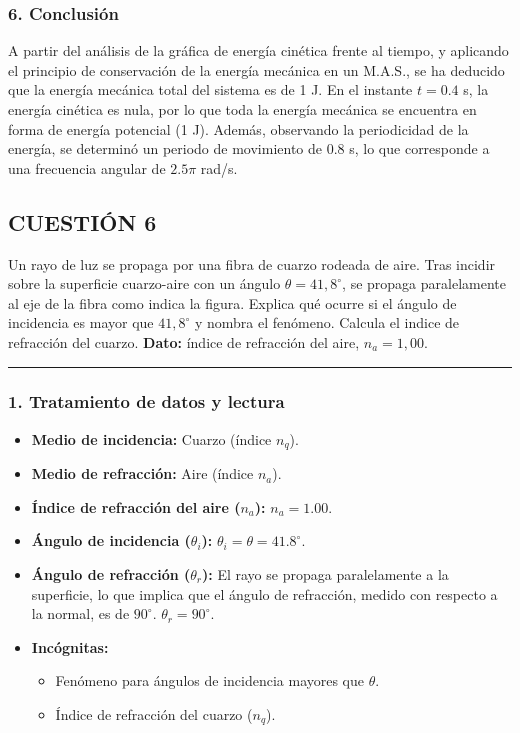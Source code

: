 \subsubsection*{6. Conclusión}
\begin{cajaconclusion}
A partir del análisis de la gráfica de energía cinética frente al tiempo, y aplicando el principio de conservación de la energía mecánica en un M.A.S., se ha deducido que la energía mecánica total del sistema es de 1 J. En el instante $t=0.4$ s, la energía cinética es nula, por lo que toda la energía mecánica se encuentra en forma de energía potencial (1 J). Además, observando la periodicidad de la energía, se determinó un periodo de movimiento de 0.8 s, lo que corresponde a una frecuencia angular de $2.5\pi$ rad/s.
\end{cajaconclusion}

\newpage
\subsection{CUESTIÓN 6}
\label{subsec:C6_2024_jun_ord}

\begin{cajaenunciado}
Un rayo de luz se propaga por una fibra de cuarzo rodeada de aire. Tras incidir sobre la superficie cuarzo-aire con un ángulo $\theta=41,8^{\circ}$, se propaga paralelamente al eje de la fibra como indica la figura. Explica qué ocurre si el ángulo de incidencia es mayor que $41,8^{\circ}$ y nombra el fenómeno. Calcula el indice de refracción del cuarzo.
\textbf{Dato:} índice de refracción del aire, $n_{a}=1,00$.
\end{cajaenunciado}
\hrule

\subsubsection*{1. Tratamiento de datos y lectura}
\begin{itemize}
    \item \textbf{Medio de incidencia:} Cuarzo (índice $n_q$).
    \item \textbf{Medio de refracción:} Aire (índice $n_a$).
    \item \textbf{Índice de refracción del aire ($n_a$):} $n_a = 1.00$.
    \item \textbf{Ángulo de incidencia ($\theta_i$):} $\theta_i = \theta = 41.8^\circ$.
    \item \textbf{Ángulo de refracción ($\theta_r$):} El rayo se propaga paralelamente a la superficie, lo que implica que el ángulo de refracción, medido con respecto a la normal, es de $90^\circ$. $\theta_r = 90^\circ$.
    \item \textbf{Incógnitas:}
    \begin{itemize}
        \item Fenómeno para ángulos de incidencia mayores que $\theta$.
        \item Índice de refracción del cuarzo ($n_q$).
    \end{itemize}
\end{itemize}

